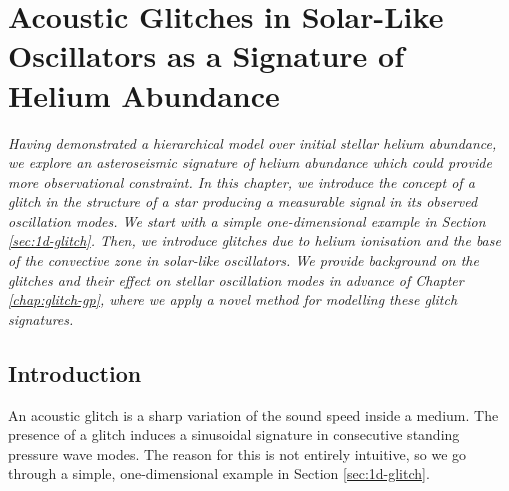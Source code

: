 %
%
%
%
%
\chapter[Acoustic Glitches in Solar-Like Oscillators]{Acoustic Glitches in Solar-Like Oscillators as a Signature of Helium Abundance}\label{chap:glitch}

\textit{Having demonstrated a hierarchical model over initial stellar helium abundance, we explore an asteroseismic signature of helium abundance which could provide more observational constraint. In this chapter, we introduce the concept of a glitch in the structure of a star producing a measurable signal in its observed oscillation modes. We start with a simple one-dimensional example in Section \ref{sec:1d-glitch}. Then, we introduce glitches due to helium ionisation and the base of the convective zone in solar-like oscillators. We provide background on the glitches and their effect on stellar oscillation modes in advance of Chapter \ref{chap:glitch-gp}, where we apply a novel method for modelling these glitch signatures.}

\section{Introduction}


An acoustic glitch is a sharp variation of the sound speed inside a medium. The presence of a glitch induces a sinusoidal signature in consecutive standing pressure wave modes. The reason for this is not entirely intuitive, so we go through a simple, one-dimensional example in Section \ref{sec:1d-glitch}. 

